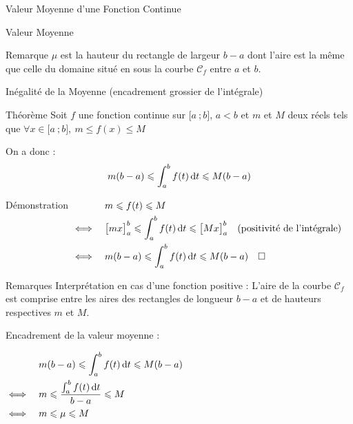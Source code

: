 \documentclass{coursbook}
\begin{document}
\begin{Gpartie}{Valeur Moyenne d'une Fonction Continue}
\begin{Spartie}{Valeur Moyenne}
\begin{SSpartie}{Remarque}
                $\mu$ est la hauteur du rectangle de largeur $b-a$ dont l'aire est la même que celle du domaine situé en sous la courbe $\mathcal{C}_f$ entre $a$ et $b$.
            \end{SSpartie}
        \end{Spartie}
        \begin{Spartie}{Inégalité de la Moyenne (encadrement \og grossier \fg{} de l'intégrale)} 
            \begin{SSpartie}{Théorème} 
                Soit $f$ une fonction continue sur $\big[a~;b\big]$, $a<b$ et $m$ et $M$ deux réels tels que $\forall x\in\big[a~;b\big],~m\leq f(x)\leq M$

                On a donc : \[m(b-a)\leqslant\int_a^b f(t)\,\mathrm{d}t\leqslant M(b-a)\]
                \begin{SSSpartie}{Démonstration} 
                    $\begin{aligned}[t]
                        &\quad m\leqslant f(t)\leqslant M \\
                        \iff&\quad\big[mx\big]_a^b\leqslant\int_a^b f(t)\,\mathrm{d}t\leqslant \big[Mx\big]_a^b\quad\text{(positivité de l'intégrale)} \\
                        \iff&\quad m(b-a)\leqslant\int_a^b f(t)\,\mathrm{d}t \leqslant M(b-a)\quad\square
                    \end{aligned}$
                \end{SSSpartie}
            \end{SSpartie}
            \begin{SSpartie}{Remarques} 
                Interprétation en cas d'une fonction positive : L'aire de la courbe $\mathcal{C}_f$ est comprise entre les aires des rectangles de longueur $b-a$ et de hauteurs respectives $m$ et $M$.
                
                Encadrement de la valeur moyenne :

                $\begin{aligned}[t]
                    &\quad m(b-a)\leq\int_a^b f(t)\dt \leq M(b-a) \\
                    \iff&\quad m\leq\frac{\int_a^b f(t)\dt}{b-a}\leq M \\
                    \iff&\quad m\leq\mu\leq M
                \end{aligned}$
            \end{SSpartie}
        \end{Spartie}
    \end{Gpartie}
    \vfill\pagebreak
\end{document}
